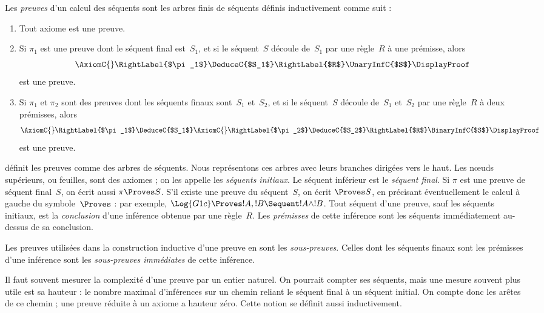 \documentclass[../../../include/open-logic-section]{subfiles}
\begin{document}
\begin{defn}
Les \emph{preuves} d'un calcul des séquents sont
les arbres finis de séquents définis inductivement
comme suit :
\begin{enumerate}
  \item{} Tout axiome est une preuve.
  \item{} Si $\pi_1$ est une preuve
  dont le séquent final est~$S_1$, et si le séquent~$S$
  découle de~$S_1$ par une règle~$R$ à une prémisse, alors
  \[
  \AxiomC{}
  \RightLabel{$\pi_1$}
  \DeduceC{$S_1$}
  \RightLabel{$R$}
  \UnaryInfC{$S$}
  \DisplayProof
  \]
  est une preuve.
  \item{} Si $\pi_1$ et $\pi_2$
  sont des preuves dont les séquents finaux sont~$S_1$
  et~$S_2$, et si le séquent~$S$ découle de~$S_1$
  et~$S_2$ par une règle~$R$ à deux prémisses, alors
  \[
  \AxiomC{}
  \RightLabel{$\pi_1$}
  \DeduceC{$S_1$}
  \AxiomC{}
  \RightLabel{$\pi_2$}
  \DeduceC{$S_2$}
  \RightLabel{$R$}
  \BinaryInfC{$S$}
  \DisplayProof
  \]
  est une preuve.
\end{enumerate}
\end{defn}

 définit les preuves comme des
arbres de séquents. Nous représentons ces arbres
avec leurs branches dirigées vers le haut.
Les nœuds supérieurs, ou feuilles, sont des axiomes ;
on les appelle les \emph{séquents initiaux}.
Le séquent inférieur est le \emph{séquent final}.
Si $\pi$ est une preuve de séquent final~$S$,
on écrit aussi $\pi \Proves S$.
S'il existe une preuve du séquent~$S$, on écrit
$\Proves S$, en précisant éventuellement le calcul
à gauche du symbole~$\Proves$ : par exemple,
$\Log{G1c} \Proves !A, !B \Sequent !A \land !B$.
Tout séquent d'une preuve, sauf les séquents initiaux,
est la \emph{conclusion} d'une inférence obtenue par
une règle~$R$. Les \emph{prémisses} de cette inférence
sont les séquents immédiatement au-dessus
de sa conclusion.

Les preuves utilisées dans la construction inductive
d'une preuve en sont les \emph{sous-preuves}.
Celles dont les séquents finaux sont les prémisses
d'une inférence sont les \emph{sous-preuves immédiates}
de cette inférence.

Il faut souvent mesurer la complexité d'une preuve
par un entier naturel. On pourrait compter ses séquents,
mais une mesure souvent plus utile est sa hauteur :
le nombre maximal d'inférences sur un chemin reliant
le séquent final à un séquent initial. On compte donc
les arêtes de ce chemin ; une preuve réduite à un axiome
a hauteur zéro. Cette notion se définit aussi inductivement.
\end{document}
